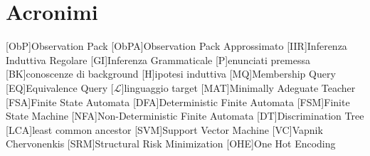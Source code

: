 %
%
\chapter*{Acronimi}
\begin{acronym}[WYSIWYM]
[ObP]{Observation Pack}
[ObPA]{Observation Pack Approssimato}
[IIR]{Inferenza Induttiva Regolare}
[GI]{Inferenza Grammaticale}
[P]{enunciati premessa}
[BK]{conoscenze di background}
[H]{ipotesi induttiva}
[MQ]{Membership Query}
[EQ]{Equivalence Query}
[$\mathcal{L}$]{linguaggio target}
[MAT]{Minimally Adeguate Teacher}
[FSA]{Finite State Automata}
[DFA]{Deterministic Finite Automata}
[FSM]{Finite State Machine}
[NFA]{Non-Deterministic Finite Automata}
[DT]{Discrimination Tree}
[LCA]{least common ancestor}
[SVM]{Support Vector Machine}
[VC]{Vapnik Chervonenkis}
[SRM]{Structural Risk Minimization}
[OHE]{One Hot Encoding}
\end{acronym}